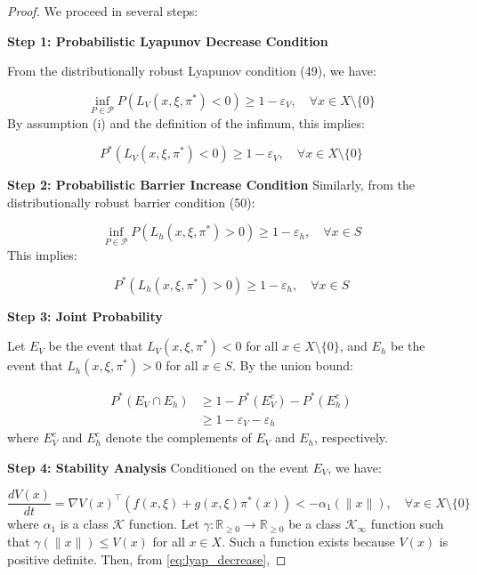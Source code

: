\documentclass[11pt, oneside]{article}
\begin{document}
\begin{proof}
We proceed in several steps:

\textbf{Step 1: Probabilistic Lyapunov Decrease Condition}

From the distributionally robust Lyapunov condition (49), we have:

\begin{equation}
    \inf_{P\in\mathcal{P}} P(L_V(x,\xi,\pi^*) < 0) \geq 1 - \varepsilon_V, \quad \forall x \in X\setminus\{0\}
\end{equation}
%
By assumption (i) and the definition of the infimum, this implies:

\begin{equation}
    P^*(L_V(x,\xi,\pi^*) < 0) \geq 1 - \varepsilon_V, \quad \forall x \in X\setminus\{0\}
    \label{eq:lyap_prob}
\end{equation}

\textbf{Step 2: Probabilistic Barrier Increase Condition}
%
Similarly, from the distributionally robust barrier condition (50):

\begin{equation}
    \inf_{P\in\mathcal{P}} P(L_h(x,\xi,\pi^*) > 0) \geq 1 - \varepsilon_h, \quad \forall x \in S
\end{equation}
%
This implies:

\begin{equation}
    P^*(L_h(x,\xi,\pi^*) > 0) \geq 1 - \varepsilon_h, \quad \forall x \in S
    \label{eq:barrier_prob}
\end{equation}

\textbf{Step 3: Joint Probability}

Let $E_V$ be the event that $L_V(x,\xi,\pi^*) < 0$ for all $x \in X\setminus\{0\}$, and $E_h$ be the event that $L_h(x,\xi,\pi^*) > 0$ for all $x \in S$. By the union bound:

\begin{align}
    P^*(E_V \cap E_h) &\geq 1 - P^*(E_V^c) - P^*(E_h^c) \\
    &\geq 1 - \varepsilon_V - \varepsilon_h
    \label{eq:joint_prob}
\end{align}
%
where $E_V^c$ and $E_h^c$ denote the complements of $E_V$ and $E_h$, respectively.

\textbf{Step 4: Stability Analysis}
%
Conditioned on the event $E_V$, we have:

\begin{equation}
    \frac{dV(x)}{dt} = \nabla V(x)^\top(f(x,\xi) + g(x,\xi)\pi^*(x)) < -\alpha_1(\|x\|), \quad \forall x \in X\setminus\{0\}
    \label{eq:lyap_decrease}
\end{equation}
%
where $\alpha_1$ is a class $\mathcal{K}$ function. Let $\gamma : \mathbb{R}_{\geq 0} \to \mathbb{R}_{\geq 0}$ be a class $\mathcal{K}_\infty$ function such that $\gamma(\|x\|) \leq V(x)$ for all $x \in X$. Such a function exists because $V(x)$ is positive definite. Then, from \eqref{eq:lyap_decrease},


\end{proof}
\end{document}
